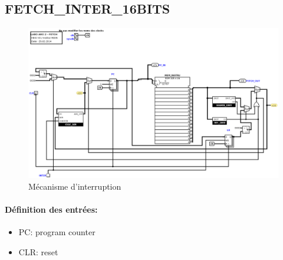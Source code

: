 \documentclass[a4paper]{article} %
\begin{document}
\subsection{FETCH\_INTER\_16BITS}

\begin{figure}[H]
    \centering
    \includegraphics[width=1\textwidth]{src/FETCH_INTER.png}
    \caption{Mécanisme d'interruption}
    \label{fetch_inter}
\end{figure}

\paragraph{Définition des entrées:}
\begin{itemize}
    \item     PC: program counter
    \item     CLR: reset
\end{itemize}
\end{document}
